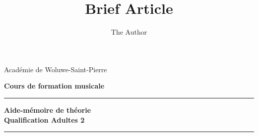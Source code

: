 \documentclass[11pt]{scrreprt}
\title{Brief Article}
\author{The Author}
\begin{document}
\thispagestyle{empty}
\begin{center}
\begin{LARGE}
Académie de Woluwe-Saint-Pierre
\end{LARGE}
\end{center}

\begin{center}
\begin{LARGE}
\textbf{Cours de formation musicale}
\end{LARGE}
\end{center}

\begin{center}
\vspace{5cm}
\noindent\rule{\textwidth}{0.5mm}
\begin{huge}
\textbf{Aide-mémoire de théorie \\
\vspace{2 cm}
 Qualification Adultes 2}
\end{huge}
\noindent\rule{\textwidth}{0.5mm}
\end{center}



\end{document}
